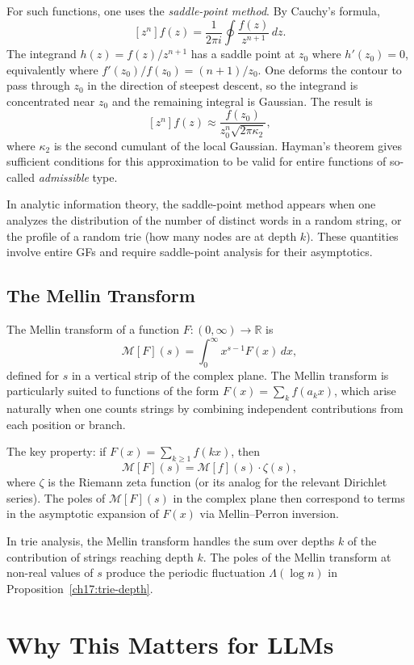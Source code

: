 For such functions, one uses the \emph{saddle-point method}. By Cauchy's formula,
\[
  [z^n] f(z) = \frac{1}{2\pi i} \oint \frac{f(z)}{z^{n+1}}\, dz.
\]
The integrand $h(z) = f(z) / z^{n+1}$ has a saddle point at $z_0$ where $h'(z_0) = 0$, equivalently where $f'(z_0)/f(z_0) = (n+1)/z_0$. One deforms the contour to pass through $z_0$ in the direction of steepest descent, so the integrand is concentrated near $z_0$ and the remaining integral is Gaussian. The result is
\[
  [z^n] f(z) \approx \frac{f(z_0)}{z_0^n \sqrt{2\pi \kappa_2}},
\]
where $\kappa_2$ is the second cumulant of the local Gaussian. Hayman's theorem gives sufficient conditions for this approximation to be valid for entire functions of so-called \emph{admissible} type.

In analytic information theory, the saddle-point method appears when one analyzes the distribution of the number of distinct words in a random string, or the profile of a random trie (how many nodes are at depth $k$). These quantities involve entire GFs and require saddle-point analysis for their asymptotics.

\subsection{The Mellin Transform}
\label{ch17:mellin}

The Mellin transform of a function $F: (0,\infty) \to \mathbb{R}$ is
\[
  \mathcal{M}[F](s) = \int_0^\infty x^{s-1} F(x)\, dx,
\]
defined for $s$ in a vertical strip of the complex plane. The Mellin transform is particularly suited to functions of the form $F(x) = \sum_k f(a_k x)$, which arise naturally when one counts strings by combining independent contributions from each position or branch.

The key property: if $F(x) = \sum_{k \geq 1} f(k x)$, then
\[
  \mathcal{M}[F](s) = \mathcal{M}[f](s) \cdot \zeta(s),
\]
where $\zeta$ is the Riemann zeta function (or its analog for the relevant Dirichlet series). The poles of $\mathcal{M}[F](s)$ in the complex plane then correspond to terms in the asymptotic expansion of $F(x)$ via Mellin--Perron inversion.

In trie analysis, the Mellin transform handles the sum over depths $k$ of the contribution of strings reaching depth $k$. The poles of the Mellin transform at non-real values of $s$ produce the periodic fluctuation $\Lambda(\log n)$ in Proposition~\ref{ch17:trie-depth}.

\section{Why This Matters for LLMs}
\label{ch17:llm-connection}

